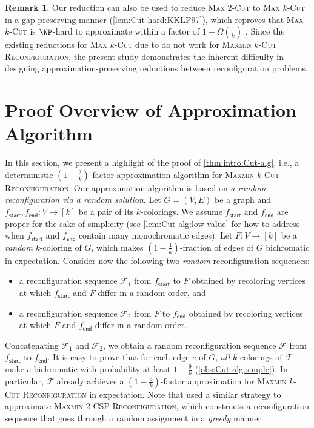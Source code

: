 \documentclass[11pt,fleqn]{article}
\newcommand{\prb}[1]{\textsc{#1}\xspace}
\newcommand{\sss}{\mathsf{start}}
\newcommand{\ttt}{\mathsf{end}}
\newcommand{\f}{f}
\newcommand{\frnd}{F}
\newcommand{\sqcol}{\scrF}
\newcommand{\MMkCutReconf}{\prb{Maxmin $k$-Cut Reconfiguration}}
\newcommand{\scrF}{\mathscr{F}}
\theoremstyle{definition}
\newtheorem{remark}[theorem]{Remark}
\numberwithin{equation}{section}
\begin{document}
\begin{remark}
Our reduction can also be used to reduce
\prb{Max 2-Cut} to \prb{Max $k$-Cut} in a gap-preserving manner (\cref{lem:Cut-hard:KKLP97}),
which reproves that
\prb{Max $k$-Cut} is $\NP$-hard to approximate within a factor of $1 - \Omega\left(\frac{1}{k}\right)$ \cite{kann1997hardness,guruswami2013improved}.
Since the existing reductions for \prb{Max $k$-Cut} due to \cite{kann1997hardness,guruswami2013improved}
do not work for \MMkCutReconf,
the present study demonstrates
the inherent difficulty in designing approximation-preserving reductions between reconfiguration problems.
\end{remark}








\section{Proof Overview of Approximation Algorithm}
\label{sec:overview-Cut-alg}


In this section, we present a highlight of the proof of \cref{thm:intro:Cut-alg}, i.e.,
a deterministic $\left(1-\frac{2}{k}\right)$-factor approximation algorithm for \MMkCutReconf.
Our approximation algorithm is based on \emph{a random reconfiguration via a random solution}.
Let $G = (V,E)$ be a graph and $\f_\sss, \f_\ttt \colon V \to [k]$ be a pair of its $k$-colorings.
We assume $\f_\sss$ and $\f_\ttt$ are proper for the sake of simplicity
(see \cref{lem:Cut-alg:low-value} for how to address when
$\f_\sss$ and $\f_\ttt$ contain many monochromatic edges).
Let $\frnd \colon V \to [k]$ be a \emph{random} $k$-coloring of $G$,
which makes $\left(1-\frac{1}{k}\right)$-fraction of edges of $G$ bichromatic in expectation.
Consider now the following two \emph{random} reconfiguration sequences:
\begin{itemize}
    \item a reconfiguration sequence $\sqcol_1$ from $\f_\sss$ to $\frnd$
obtained by recoloring vertices at which
$\f_\sss$ and $\frnd$ differ in a random order, and
    \item a reconfiguration sequence $\sqcol_2$ from $\frnd$ to $\f_\ttt$
obtained by recoloring vertices at which
$\frnd$ and $\f_\ttt$ differ in a random order.
\end{itemize}
Concatenating $\sqcol_1$ and $\sqcol_2$,
we obtain a random reconfiguration sequence $\sqcol$ from $\f_\sss$ to $\f_\ttt$.
It is easy to prove that
for each edge $e$ of $G$,
\emph{all} $k$-colorings of $\sqcol$ make $e$ bichromatic with probability at least $1-\frac{9}{k}$
(\cref{obs:Cut-alg:simple}).
In particular, $\sqcol$ already achieves a $\left(1-\frac{9}{k}\right)$-factor approximation for \MMkCutReconf in expectation.
Note that \citet{karthik2023inapproximability}
used a similar strategy to approximate \prb{Maxmin 2-CSP Reconfiguration},
which constructs a reconfiguration sequence that goes through a random assignment in a \emph{greedy} manner.
\end{document}
